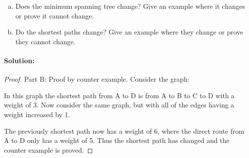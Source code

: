 \documentclass[12pt]{article}
\begin{document}
\begin{enumerate}[(a)]
\item Does the minimum spanning tree change? Give an example where it
      changes or prove it cannot change.
\item Do the shortest paths change? Give an example where they change or
      prove they cannot change.
\end{enumerate}

\paragraph{Solution:}
\begin{proof}
Part B:  Proof by counter example.
Consider the graph:

\begin{center}
\end{center}

In this graph the shortest path from A to D is from A to B to C to D
with a weight of 3. Now consider the same graph, but with all of the
edges having a weight increased by 1.

\begin{center}
\end{center}

The previously shortest path now has a weight of 6, where the direct
route from A to D only has a weight of 5.  Thus the shortest path has
changed and the counter example is proved.
\end{proof}
\end{document}
